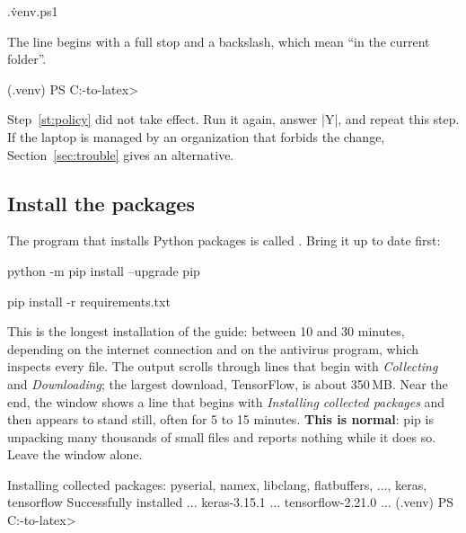\label{st:activate}
\begin{ps}
.\.venv\Scripts\Activate.ps1
\end{ps}
The line begins with a full stop and a backslash, which mean ``in the current folder''.
\begin{out}
(.venv) PS C:\camera-to-latex>
\end{out}

\begin{iffail}
Step~\ref{st:policy} did not take effect. Run it again, answer \code|Y|, and repeat this step.
If the laptop is managed by an organization that forbids the change,
Section~\ref{sec:trouble} gives an alternative.
\end{iffail}

\subsection{Install the packages}

The program that installs Python packages is called . Bring it up to date first:
\begin{ps}
python -m pip install --upgrade pip
\end{ps}

\label{st:pipinstall}
\begin{ps}
pip install -r requirements.txt
\end{ps}
This is the longest installation of the guide: between 10 and 30 minutes, depending on the
internet connection and on the antivirus program, which inspects every file. The output scrolls
through lines that begin with \emph{Collecting} and \emph{Downloading}; the largest download,
TensorFlow, is about 350\,MB. Near the end, the window shows a line that begins with
\emph{Installing collected packages} and then appears to stand still, often for 5 to 15 minutes.
\textbf{This is normal}: pip is unpacking many thousands of small files and reports nothing
while it does so. Leave the window alone.
\begin{out}
Installing collected packages: pyserial, namex, libclang, flatbuffers, ..., keras, tensorflow
Successfully installed ... keras-3.15.1 ... tensorflow-2.21.0 ...
(.venv) PS C:\camera-to-latex>
\end{out}


